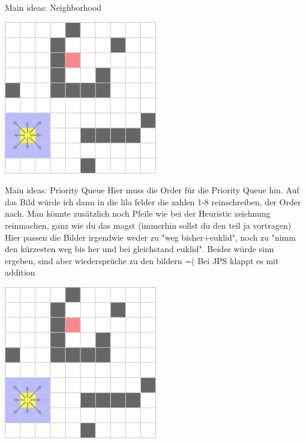 \documentclass{presentation}
\begin{document}
\begin{frame}
\end{frame}


\begin{frame}{Main ideas: Neighborhood}
	\begin{center}
		\includegraphics[width=0.5\textwidth]{figures/A-Stern_geschnitten(241x241)/2.png}
	\end{center}
\end{frame}


\begin{frame}{Main ideas: Priority Queue}
Hier muss die Order für die Priority Queue hin. Auf das Bild würde ich dann in die lila felder die zahlen 1-8 reinschreiben, der Order nach. Man könnte zusätzlich noch Pfeile wie bei der Heuristic zeichnung reinmachen, ganz wie du das magst (immerhin sollst du den teil ja vortragen)
Hier passen die Bilder irgendwie weder zu "weg bisher+euklid", noch zu "nimm den kürzesten weg bis her und bei gleichstand euklid". Beides würde sinn ergeben, sind aber wiedersprüche zu den bildern =( Bei JPS klappt es mit addition
	\begin{center}
		\includegraphics[width=0.5\textwidth]{figures/A-Stern_geschnitten(241x241)/2.png}
	\end{center}
\end{frame}
\end{document}
